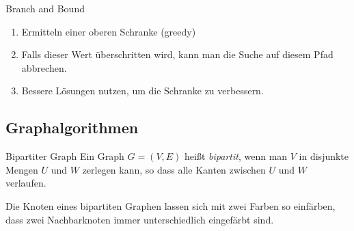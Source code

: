 \begin{defi}{Branch and Bound}
    \begin{enumerate}
        \item Ermitteln einer oberen Schranke (greedy)
        \item Falls dieser Wert überschritten wird, kann man die Suche auf diesem Pfad abbrechen.
        \item Bessere Lösungen nutzen, um die Schranke zu verbessern.
    \end{enumerate}
\end{defi}


\subsection{Graphalgorithmen}

\begin{defi}{Bipartiter Graph}
    Ein Graph $G=(V, E)$ heißt \emph{bipartit}, wenn man $V$ in disjunkte Mengen $U$ und $W$ zerlegen kann, so dass alle Kanten zwischen $U$ und $W$ verlaufen.

    Die Knoten eines bipartiten Graphen lassen sich mit zwei Farben so einfärben, dass zwei Nachbarknoten immer unterschiedlich eingefärbt sind.
\end{defi}

